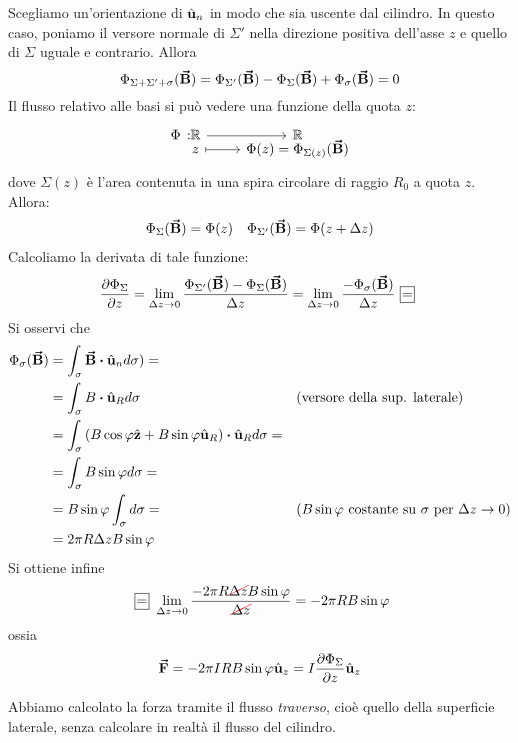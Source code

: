 Scegliamo un'orientazione di $\hat{\mathbf{u}}_n$ in modo che sia uscente dal cilindro.
In questo caso, poniamo il versore normale di $\Sigma'$ nella direzione positiva dell'asse $z$ e quello di $\Sigma$ uguale e contrario. Allora
\begin{equation*}
	\Phi_{\Sigma+\Sigma'+\sigma}(\vb*{\va{B}})=\Phi_{\Sigma'}(\vb*{\va{B}})-\Phi_{\Sigma}(\vb*{\va{B}})+\Phi_{\sigma}(\vb*{\va{B}})=0
\end{equation*}
Il flusso relativo alle basi si può vedere una funzione della quota $z$:
\begin{equation*}
	\funztot[\Phi]{\realset}{\realset}{z}{\Phi(z)=\Phi_{\Sigma(z)}(\vba{B})}
\end{equation*}
dove $\Sigma(z)$ è l'area contenuta in una spira circolare di raggio $R_0$ a quota $z$. Allora:
\begin{align*}
	\Phi_{\Sigma}(\vb*{\va{B}})=\Phi(z)&&\Phi_{\Sigma'}(\vb*{\va{B}})=\Phi(z+\Delta z)
\end{align*}
Calcoliamo la derivata di tale funzione:
\begin{equation*}
	\pdv{\Phi_{\Sigma}}{z}=\lim_{\Delta z\to 0}\frac{\Phi_{\Sigma'}(\vba{B})-\Phi_{\Sigma}(\vba{B})}{\Delta z}=\lim_{\Delta z\to 0}\frac{-\Phi_{\sigma}(\vba{B})}{\Delta z}\squarequal
\end{equation*}
Si osservi che
\begin{align*}
	\Phi_{\sigma}(\vba{B})&=\int_{\sigma}\vba{B}\vdot\vbh{u}_nd\sigma)=&&\\
	&=\int_{\sigma}B\vdot\vbh{u}_Rd\sigma&&\text{(versore della sup. laterale)}\\
	&=\int_{\sigma}\left(B\cos\phi\vbh{z}+B\sin\phi\vbh{u}_R\right)\vdot\vbh{u}_Rd\sigma=&&\\
	&=\int_{\sigma}B\sin\phi d\sigma=&&\\
	&=B\sin\phi\int_{\sigma}d\sigma=&&\text{(}B\sin\phi\ \text{costante su}\ \sigma\ \text{per}\ \Delta z\to 0\text{)}\\
	&=2\pi R \Delta z B\sin\phi&&
\end{align*}
Si ottiene infine
\begin{equation*}
	\squarequal\lim_{\Delta z\to 0}\frac{-2\pi R \Ccancel[red]{\Delta z} B\sin\phi}{\Ccancel[red]{\Delta z}}=-2\pi R B\sin\phi
\end{equation*}
ossia
\begin{equation}
	\vb*{\va{F}}=-2\pi IRB\sin\varphi\hat{\mathbf{u}}_z=I\pdv{\Phi_{\Sigma}}{z}\hat{\mathbf{u}}_z
\end{equation}
\begin{observe}
	Abbiamo calcolato la forza tramite il flusso \textit{traverso}, cioè quello della superficie laterale, senza calcolare in realtà il flusso del cilindro.
\end{observe} %
